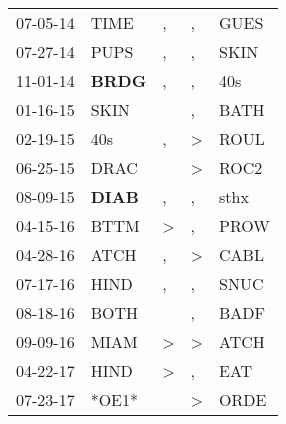 \begin{supertabular}{p{0.07\textwidth}p{0.06\textwidth}p{0.02\textwidth}p{0.02\textwidth}p{0.06\textwidth}}
          07-05-14\textsuperscript{} &           TIME\textsuperscript{} &                , &                , &           GUES\textsuperscript{} \\
          07-27-14\textsuperscript{} &           PUPS\textsuperscript{} &                , &                , &           SKIN\textsuperscript{} \\
          11-01-14\textsuperscript{} &  \textbf{BRDG\textsuperscript{}} &                , &                , &            40s\textsuperscript{} \\
          01-16-15\textsuperscript{} &           SKIN\textsuperscript{} &                  &                , &           BATH\textsuperscript{} \\
          02-19-15\textsuperscript{} &            40s\textsuperscript{} &                , &     \textgreater &           ROUL\textsuperscript{} \\
          06-25-15\textsuperscript{} &           DRAC\textsuperscript{} &                  &     \textgreater &           ROC2\textsuperscript{} \\
          08-09-15\textsuperscript{} &  \textbf{DIAB\textsuperscript{}} &                , &                , &           sthx\textsuperscript{} \\
          04-15-16\textsuperscript{} &           BTTM\textsuperscript{} &     \textgreater &                , &           PROW\textsuperscript{} \\
          04-28-16\textsuperscript{} &           ATCH\textsuperscript{} &                , &     \textgreater &           CABL\textsuperscript{} \\
          07-17-16\textsuperscript{} &           HIND\textsuperscript{} &                , &                , &           SNUC\textsuperscript{} \\
          08-18-16\textsuperscript{} &           BOTH\textsuperscript{} &                  &                , &           BADF\textsuperscript{} \\
          09-09-16\textsuperscript{} &           MIAM\textsuperscript{} &     \textgreater &     \textgreater &           ATCH\textsuperscript{} \\
          04-22-17\textsuperscript{} &           HIND\textsuperscript{} &     \textgreater &                , &            EAT\textsuperscript{} \\
          07-23-17\textsuperscript{} &                            *OE1* &                  &     \textgreater &           ORDE\textsuperscript{} \\

\end{supertabular}
